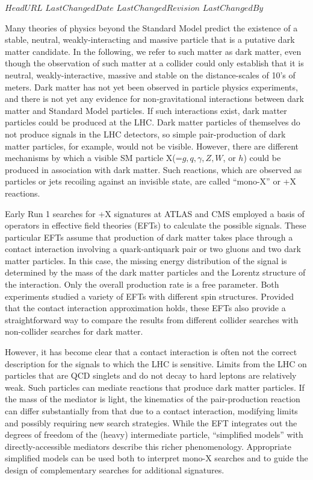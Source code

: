 \svnidlong
{$HeadURL$}
{$LastChangedDate$}
{$LastChangedRevision$}
{$LastChangedBy$}

Many theories of physics beyond the Standard Model predict the existence
of a stable, neutral, weakly-interacting and massive particle that is
a putative dark matter candidate.   In the following, we refer to such
matter as dark matter, even though the observation of such matter at a collider
could only establish that it is neutral, weakly-interactive, massive and stable
on the distance-scales of 10's of meters.
Dark matter has not yet been observed in particle physics experiments, and
there is not yet any evidence for non-gravitational interactions
between dark matter and Standard Model particles.  If such
interactions exist, dark matter particles could be produced
at the LHC. Dark matter particles of themselves do not produce signals
in the LHC
detectors, so simple pair-production of dark matter particles, for example,
would
not be visible.
However, there are different mechanisms by which a
visible SM particle X(=$g, q, \gamma, Z, W$, or $h$)
could be produced in association with dark matter.
Such reactions, which are
observed as particles or jets recoiling against an invisible state, are
called ``mono-X'' or \MET{}+X reactions.


Early Run 1 searches for \MET{}+X signatures at ATLAS and CMS employed
a basis of operators in 
effective field theories (EFTs) \cite{Goodman:2010ku} to
calculate the possible signals.
These particular EFTs assume that production of dark matter takes place through
a contact interaction involving a quark-antiquark pair or two gluons and
two dark matter particles.  In this case,
the missing
energy distribution of the signal is determined
by the mass of the dark
matter particles and the Lorentz structure of the interaction. Only the
overall production rate is a free parameter. Both experiments studied a variety
of EFTs with different spin structures. Provided that the contact
interaction approximation holds, these EFTs also provide a
straightforward way to compare the results from different collider
searches with non-collider searches for dark matter.

However, it has become clear \cite{Bai:2010hh,Kopp:2011eu,Fox:2011fx,Fox:2011pm,Busoni:2013lha} that a contact
interaction is often not the correct description for the signals to
which the LHC is sensitive.
Limits from the LHC on particles that are
QCD singlets and do not decay to hard leptons are relatively
weak. Such particles can mediate reactions that produce dark matter
particles. If the mass of the mediator is light, the kinematics of the
pair-production reaction can differ substantially from that due to a contact
interaction, modifying limits and possibly requiring new search strategies.
While the EFT integrates
out the degrees of freedom of the (heavy) intermediate particle,
``simplified models'' \cite{Alwall:2008ag,Alves:2011wf} with
directly-accessible mediators describe this richer
phenomenology. Appropriate simplified models can be used both to
interpret mono-X searches and to guide the design of complementary
searches for additional signatures.

